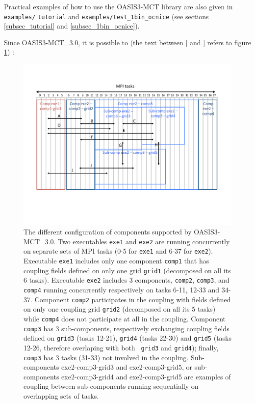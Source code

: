 Practical examples of how to use the OASIS3-MCT library are also given in {\tt examples/} {\tt tutorial} and {\tt examples/test\_1bin\_ocnice} (see sections \ref{subsec_tutorial} and \ref{subsec_1bin_ocnice}). 

Since OASIS3-MCT\_3.0, it is possible to (the text between [ and ] refers to figure \ref{Fig_coupling_layouts_a}) :

\begin{figure}
  \includegraphics[scale=.6]{figures/coupling_layouts_a}
  \caption{The different configuration of components supported by OASIS3-MCT\_3.0. Two executables {\tt exe1} and {\tt exe2} are running concurrently on separate sets of MPI tasks (0-5 for {\tt exe1} and 6-37 for {\tt exe2}). Executable {\tt exe1} includes only one component {\tt comp1} that has coupling fields defined on only one grid {\tt grid1} (decomposed on all its 6 tasks). Executable {\tt exe2} includes 3 components, {\tt comp2}, {\tt comp3}, and {\tt comp4} running concurrently respectively on tasks 6-11, 12-33 and 34-37. Component {\tt comp2} participates in the coupling with fields defined on only one coupling grid {\tt grid2} (decomposed on all its 5 tasks) while {\tt comp4} does not participate at all in the coupling. 
Component {\tt comp3} has 3 sub-components, respectively exchanging
coupling fields defined on {\tt grid3} (tasks 12-21), {\tt grid4}
(tasks 22-30) and {\tt grid5} (tasks 12-26, therefore overlaping with both {\tt
  grid3} and {\tt grid4}); finally, {\tt comp3} has 3 tasks (31-33)
not involved in the coupling. Sub-components exe2-comp3-grid3 and
exe2-comp3-grid5, or sub-components exe2-comp3-grid4 and
exe2-comp3-grid5 are examples of coupling between sub-components running sequentially on overlapping sets of tasks.}
  \label{Fig_coupling_layouts_a}
\end{figure}

